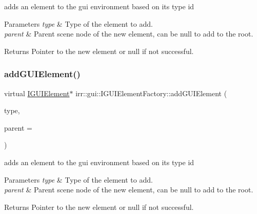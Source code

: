 adds an element to the gui environment based on its type id 


\begin{DoxyParams}{Parameters}
{\em type} & Type of the element to add. \\
\hline
{\em parent} & Parent scene node of the new element, can be null to add to the root. \\
\hline
\end{DoxyParams}
\begin{DoxyReturn}{Returns}
Pointer to the new element or null if not successful. 
\end{DoxyReturn}
\mbox{\label{classirr_1_1gui_1_1IGUIElementFactory_aaaa0dda5493286ff745310b441347019}} 
\subsubsection{\texorpdfstring{add\+G\+U\+I\+Element()}{addGUIElement()}\hspace{0.1cm}{\footnotesize\ttfamily [2/4]}}
{\footnotesize\ttfamily virtual \hyperlink{classirr_1_1gui_1_1IGUIElement}{I\+G\+U\+I\+Element}$\ast$ irr\+::gui\+::\+I\+G\+U\+I\+Element\+Factory\+::add\+G\+U\+I\+Element (\begin{DoxyParamCaption}\item[{\hyperlink{namespaceirr_1_1gui_ae4d66df0ecf4117cdbcf9f22404bd254}{E\+G\+U\+I\+\_\+\+E\+L\+E\+M\+E\+N\+T\+\_\+\+T\+Y\+PE}}]{type,  }\item[{\hyperlink{classirr_1_1gui_1_1IGUIElement}{I\+G\+U\+I\+Element} $\ast$}]{parent = {} }\end{DoxyParamCaption})\hspace{0.3cm}{\ttfamily [pure virtual]}}



adds an element to the gui environment based on its type id 


\begin{DoxyParams}{Parameters}
{\em type} & Type of the element to add. \\
\hline
{\em parent} & Parent scene node of the new element, can be null to add to the root. \\
\hline
\end{DoxyParams}
\begin{DoxyReturn}{Returns}
Pointer to the new element or null if not successful. 
\end{DoxyReturn}
\mbox{\label{classirr_1_1gui_1_1IGUIElementFactory_aec55be9ef891ba1b19c5d9c5a85130a4}} 

